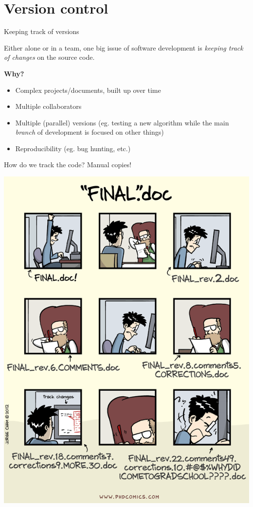 
\section{Version control}

\begin{frame}[fragile]{Keeping track of versions}

Either alone or in a team, one big issue of software development is \textit{keeping
track of changes} on the source code.

\vspace{1em}

\textbf{Why?}
\begin{itemize}
\item Complex projects/documents, built up over time
\item Multiple collaborators
\item Multiple (parallel) versions (eg. testing a new algorithm while the main
\textit{branch} of development is focused on other things)
\item Reproducibility (eg. bug hunting, etc.)
\end{itemize}
\end{frame}

\begin{frame}[fragile]{How do we track the code? Manual copies!}

\begin{center}
\includegraphics[height=0.89\textheight]{phd101212s}
\end{center}

\end{frame}

